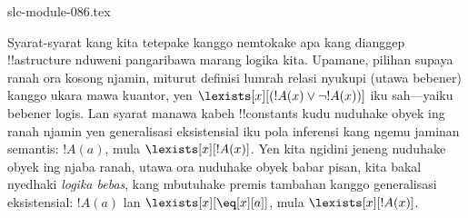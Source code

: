 \begin{filecontents*}[overwrite]{slc-module-086.tex}
\begin{digress}
Syarat-syarat kang kita tetepake kanggo nemtokake apa kang dianggep
!!a{structure} nduweni pangaribawa marang logika kita. Upamane,
pilihan supaya ranah ora kosong njamin, miturut definisi lumrah
relasi nyukupi (utawa bebener) kanggo ukara mawa kuantor, yen
$\lexists[x][(!A(x) \lor \lnot !A(x))]$ iku sah---yaiku bebener
logis. Lan syarat manawa kabeh !!{constant}s kudu nuduhake obyek
ing ranah njamin yen generalisasi eksistensial iku pola inferensi
kang ngemu jaminan semantis: $!A(a)$, mula
$\lexists[x][!A(x)]$. Yen kita ngidini jeneng nuduhake obyek
ing njaba ranah, utawa ora nuduhake obyek babar pisan, kita bakal
nyedhaki \emph{logika bebas}, kang mbutuhake premis tambahan kanggo
generalisasi eksistensial: $!A(a)$ lan
$\lexists[x][\eq[x][a]]$, mula $\lexists[x][!A(x)]$.
\end{digress}


\end{filecontents*}

